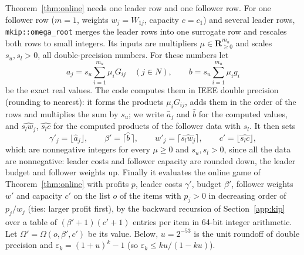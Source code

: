 Theorem~\ref{thm:online} needs one leader row and one follower row. For one
follower row ($m=1$, weights $w_j=W_{1j}$, capacity $c=c_1$) and several leader
rows, \texttt{mkip::omega\_root} merges the leader rows into one surrogate
row\cite{glover1968surrogate} and rescales both rows to small integers. Its inputs are multipliers
$\mu\in\mathbf{R}^{m_u}_{\ge 0}$ and scales $s_u,s_l>0$, all double-precision
numbers. For these numbers let
\[
  a_j=s_u\sum_{i=1}^{m_u}\mu_iG_{ij}\quad(j\in N),\qquad b=s_u\sum_{i=1}^{m_u}\mu_ig_i
\]
be the exact real values. The code computes them in IEEE double precision
(rounding to nearest): it forms the products $\mu_iG_{ij}$, adds them in the
order of the rows and multiplies the sum by $s_u$; we write $\hat a_j$ and
$\hat b$ for the computed values, and $\widehat{s_lw_j}$, $\widehat{s_lc}$ for
the computed products of the follower data with $s_l$. It then sets
\[
  \gamma'_j=\lfloor\hat a_j\rfloor,\qquad
  \beta'=\lceil\hat b\,\rceil,\qquad
  w'_j=\lceil\widehat{s_lw_j}\rceil,\qquad
  c'=\lfloor\widehat{s_lc}\rfloor,
\]
which are nonnegative integers for every $\mu\ge 0$ and $s_u,s_l>0$, since
all the data are nonnegative: leader costs and follower capacity are rounded
down, the leader budget and follower weights up. Finally it evaluates the
online game of Theorem~\ref{thm:online} with profits $p$, leader costs
$\gamma'$, budget $\beta'$, follower weights $w'$ and capacity $c'$ on the
list $o$ of the items with $p_j>0$ in decreasing order of $p_j/w_j$ (ties:
larger profit first), by the backward recursion of Section~\ref{app:kip} over
a table of $(\beta'+1)(c'+1)$ entries per item in 64-bit integer arithmetic.
Let $\Omega'=\Omega(o,\beta',c')$ be its value. Below,
$u=2^{-53}$ is the unit roundoff of double precision and
$\varepsilon_k=(1+u)^k-1$ (so $\varepsilon_k\le ku/(1-ku)$).


